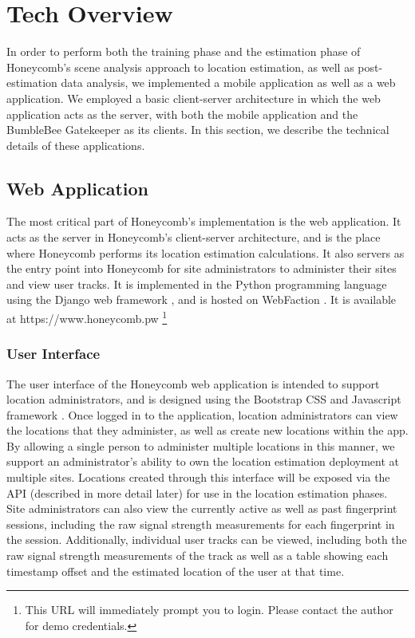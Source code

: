 \chapter{Tech Overview}
\label{tech-overview}
%

In order to perform both the training phase and the estimation phase of Honeycomb's scene analysis approach to location estimation, as well as post-estimation data analysis, we implemented a mobile application as well as a web application. We employed a basic client-server architecture in which the web application acts as the server, with both the mobile application and the BumbleBee Gatekeeper as its clients. In this section, we describe the technical details of these applications.


\section{Web Application}
%


The most critical part of Honeycomb's implementation is the web application. It acts as the server in Honeycomb's client-server architecture, and is the place where Honeycomb performs its location estimation calculations. It also servers as the entry point into Honeycomb for site administrators to administer their sites and view user tracks. It is implemented in the Python programming language using the Django web framework \cite{django}, and is hosted on WebFaction \cite{webfaction}. It is available at https://www.honeycomb.pw \footnote{This URL will immediately prompt you to login. Please contact the author for demo credentials.}


\subsection{User Interface}
%


The user interface of the Honeycomb web application is intended to support location administrators, and is designed using the Bootstrap CSS and Javascript framework \cite{bootstrap}. Once logged in to the application, location administrators can view the locations that they administer, as well as create new locations within the app. By allowing a single person to administer multiple locations in this manner, we support an administrator's ability to own the location estimation deployment at multiple sites. Locations created through this interface will be exposed via the API (described in more detail later) for use in the location estimation phases. Site administrators can also view the currently active as well as past fingerprint sessions, including the raw signal strength measurements for each fingerprint in the session. Additionally, individual user tracks can be viewed, including both the raw signal strength measurements of the track as well as a table showing each timestamp offset and the estimated location of the user at that time. 
	

